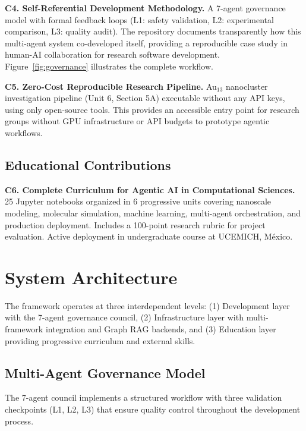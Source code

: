 \documentclass[11pt]{article}
\begin{document}
\textbf{C4. Self-Referential Development Methodology.}
A 7-agent governance model with formal feedback loops (L1: safety validation, L2: experimental comparison, L3: quality audit). The repository documents transparently how this multi-agent system co-developed itself, providing a reproducible case study in human-AI collaboration for research software development. Figure~\ref{fig:governance} illustrates the complete workflow.



\textbf{C5. Zero-Cost Reproducible Research Pipeline.}
Au$_{13}$ nanocluster investigation pipeline (Unit 6, Section 5A) executable without any API keys, using only open-source tools. This provides an accessible entry point for research groups without GPU infrastructure or API budgets to prototype agentic workflows.

\subsection{Educational Contributions}

\textbf{C6. Complete Curriculum for Agentic AI in Computational Sciences.}
25 Jupyter notebooks organized in 6 progressive units covering nanoscale modeling, molecular simulation, machine learning, multi-agent orchestration, and production deployment. Includes a 100-point research rubric for project evaluation. Active deployment in undergraduate course at UCEMICH, México.

\section{System Architecture}

The framework operates at three interdependent levels: (1) Development layer with the 7-agent governance council, (2) Infrastructure layer with multi-framework integration and Graph RAG backends, and (3) Education layer providing progressive curriculum and external skills.

% 

\subsection{Multi-Agent Governance Model}

The 7-agent council implements a structured workflow with three validation checkpoints (L1, L2, L3) that ensure quality control throughout the development process.
\end{document}
